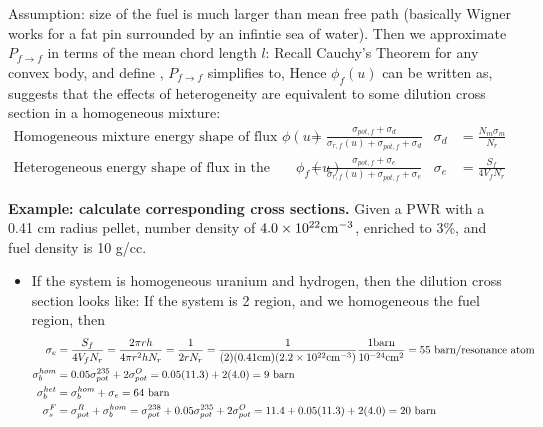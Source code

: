 \documentclass{school-22.211-notes}
\begin{document}
Assumption: size of the fuel is much larger than mean free path (basically Wigner works for a fat pin surrounded by an infintie sea of water). Then we approximate $P_{f\to f}$ in terms of the mean chord length $l$: 
Recall Cauchy's Theorem for any convex body, 
and define ,
$P_{f\to f}$ simplifies to, 
Hence $\phi_f(u)$ can be written as, 
 suggests that the effects of heterogeneity are equivalent to some dilution cross section in a homogeneous mixture:
\begin{align}
\mbox{Homogeneous mixture energy shape of flux } \phi(u) &= \frac{\sigma_{pot, f} + \sigma_d}{\sigma_{r,f} (u) + \sigma_{pot, f} + \sigma_d}   & \sigma_d &= \frac{N_m \sigma_m}{N_r}  \\
\mbox{Heterogeneous energy shape of flux in the fuel } \phi_f(u) &= \frac{\sigma_{pot, f} + \sigma_e}{\sigma_{r,f} (u) + \sigma_{pot, f} + \sigma_e}   & \sigma_e &= \frac{S_f}{4 V_f N_r} 
\end{align}

\textbf{Example: calculate corresponding cross sections.} Given a PWR with a 0.41 cm radius pellet,  number density of $4.0 \times 10^{22} \mathrm{cm}^{-3}$, enriched to 3\%, and fuel density is 10 g/cc. 
\begin{itemize}
\item If the system is homogeneous uranium and hydrogen, then the dilution cross section looks like:
If the system is 2 region, and we homogeneous the fuel region, then
\begin{align}
\sigma_e &= \frac{S_f}{4 V_f N_r} = \frac{2 \pi r h}{4 \pi r^2 h N_r} = \frac{1}{2 r N_r} = \frac{1}{(2)(0.41 \mathrm{cm})(2.2 \times 10^{22} \mathrm{cm}^{-3})} \frac{1 \mathrm{barn}}{10^{-24} \mathrm{cm}^2} = 55 \mbox{ } \mathrm{barn}/\mbox{resonance atom} \\
\sigma_b^{hom} &=  0.05 \sigma_{pot}^{235} + 2 \sigma_{pot}^O = 0.05 (11.3) + 2 (4.0) = 9 \mbox{ } \mathrm{barn} \\
\sigma_b^{het} &= \sigma_b^{hom} + \sigma_e = 64 \mbox{ } \mathrm{barn} \\ 
\sigma_s^F &= \sigma_{pot}^R + \sigma_b^{hom} = \sigma_{pot}^{238} + 0.05 \sigma_{pot}^{235} + 2 \sigma_{pot}^O = 11.4 + 0.05 (11.3) + 2 (4.0) = 20 \mbox{ } \mathrm{barn} 
\end{align} 
\end{itemize}
\end{document}
